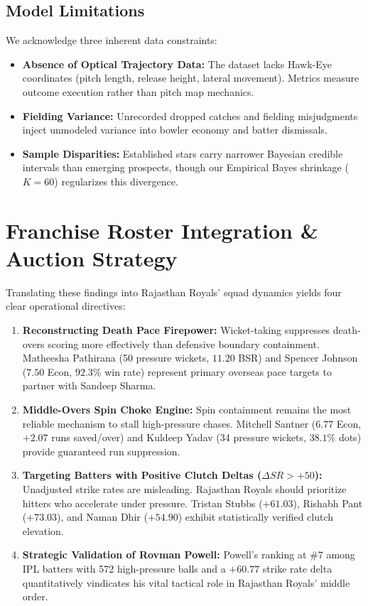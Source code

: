 \documentclass[11pt,a4paper]{article}
\begin{document}
\subsection{Model Limitations}
We acknowledge three inherent data constraints:
\begin{itemize}[leftmargin=*,itemsep=2pt]
    \item \textbf{Absence of Optical Trajectory Data:} The dataset lacks Hawk-Eye coordinates (pitch length, release height, lateral movement). Metrics measure outcome execution rather than pitch map mechanics.
    \item \textbf{Fielding Variance:} Unrecorded dropped catches and fielding misjudgments inject unmodeled variance into bowler economy and batter dismissals.
    \item \textbf{Sample Disparities:} Established stars carry narrower Bayesian credible intervals than emerging prospects, though our Empirical Bayes shrinkage ($K = 60$) regularizes this divergence.
\end{itemize}

\section{Franchise Roster Integration \& Auction Strategy}

Translating these findings into Rajasthan Royals' squad dynamics yields four clear operational directives:
\begin{enumerate}[leftmargin=*,itemsep=3pt]
    \item \textbf{Reconstructing Death Pace Firepower:} Wicket-taking suppresses death-overs scoring more effectively than defensive boundary containment. Matheesha Pathirana (50 pressure wickets, $11.20$ BSR) and Spencer Johnson ($7.50$ Econ, $92.3\%$ win rate) represent primary overseas pace targets to partner with Sandeep Sharma.
    \item \textbf{Middle-Overs Spin Choke Engine:} Spin containment remains the most reliable mechanism to stall high-pressure chases. Mitchell Santner ($6.77$ Econ, $+2.07$ runs saved/over) and Kuldeep Yadav (34 pressure wickets, $38.1\%$ dots) provide guaranteed run suppression.
    \item \textbf{Targeting Batters with Positive Clutch Deltas ($\Delta SR > +50$):} Unadjusted strike rates are misleading. Rajasthan Royals should prioritize hitters who accelerate under pressure. Tristan Stubbs ($+61.03$), Rishabh Pant ($+73.03$), and Naman Dhir ($+54.90$) exhibit statistically verified clutch elevation.
    \item \textbf{Strategic Validation of Rovman Powell:} Powell's ranking at \#7 among IPL batters with 572 high-pressure balls and a $+60.77$ strike rate delta quantitatively vindicates his vital tactical role in Rajasthan Royals' middle order.
\end{enumerate}
\end{document}
